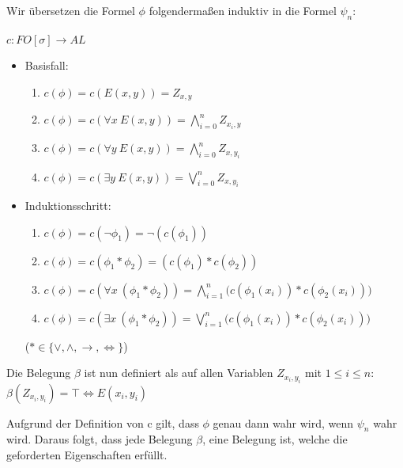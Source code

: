 \documentclass[a4paper,10pt]{article}
\begin{document}
Wir übersetzen die Formel $\phi$ folgendermaßen induktiv in die Formel $\psi_n$: \\
\ \\
$c: FO[\sigma] \rightarrow AL$ 
\begin{itemize}
	\item 	Basisfall: 
		\begin{enumerate}
		\setlength{\itemindent}{2em}
		\item  $c(\phi) = c(E(x,y)) = Z_{x,y}$
		\item  $c(\phi) = c(\forall x~ E(x,y)) = \bigwedge\limits_{i = 0}^n Z_{x_i,y}$
		\item  $c(\phi) = c(\forall y~ E(x,y)) = \bigwedge\limits_{i = 0}^n Z_{x,y_i}$  
		\item  $c(\phi) = c(\exists y~ E(x,y)) = \bigvee\limits_{i = 0}^n Z_{x,y_i}$
		\end{enumerate}
	\item 	Induktionsschritt: 
		\begin{enumerate}
		\setlength{\itemindent}{2em}
		\item  $c(\phi) = c(\lnot\phi_1) = \lnot (c(\phi_1))$
		\item   $c(\phi) = c(\phi_1 * \phi_2) = (c(\phi_1) * c(\phi_2))$
		\item  $c(\phi) = c(\forall x~(\phi_1 * \phi_2)) = 
		\bigwedge\limits_{i = 1}^n \Big( c(\phi_1(x_i)) * c(\phi_2(x_i)) \Big)$ 
		\item  $c(\phi) = c(\exists x~(\phi_1 * \phi_2)) = 
		\bigvee\limits_{i = 1}^n \Big( c(\phi_1(x_i)) * c(\phi_2(x_i)) \Big)$ \\
		\end{enumerate}
		($* \in \{\lor, \land, \rightarrow, \Leftrightarrow\}$)
\end{itemize}
Die Belegung $\beta$ ist nun definiert als auf allen Variablen $Z_{x_i,y_i}$ mit $1 \le i \le n$: $\beta(Z_{x_i,y_i}) = \top \Leftrightarrow E(x_i,y_i)$

Aufgrund der Definition von c gilt, dass $\phi$ genau dann wahr wird, wenn $\psi_n$ wahr wird. Daraus folgt, dass jede Belegung $\beta$, 
eine Belegung ist, welche die geforderten Eigenschaften erfüllt.
\end{document}
